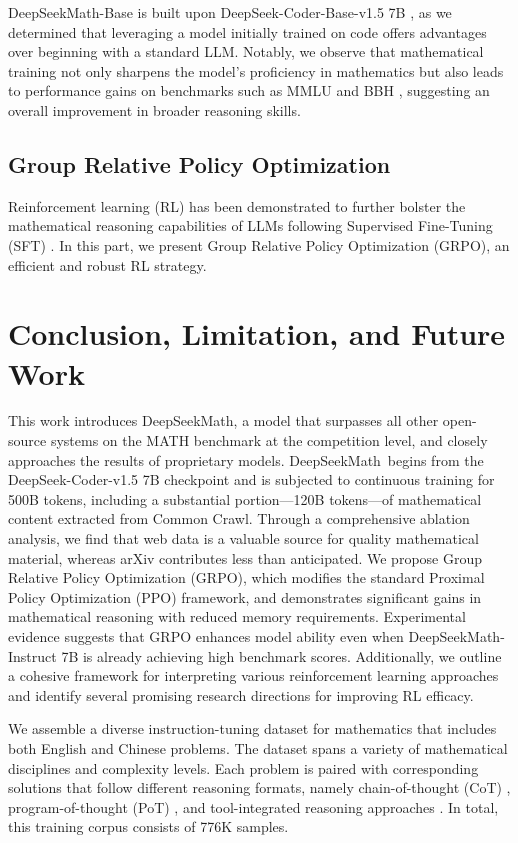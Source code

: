 DeepSeekMath-Base is built upon DeepSeek-Coder-Base-v1.5 7B \citep{deepseek-coder}, as we determined that leveraging a model initially trained on code offers advantages over beginning with a standard LLM. Notably, we observe that mathematical training not only sharpens the model’s proficiency in mathematics but also leads to performance gains on benchmarks such as MMLU \citep{mmlu} and BBH \citep{bbh}, suggesting an overall improvement in broader reasoning skills.

\subsection{Group Relative Policy Optimization} Reinforcement learning (RL) has been demonstrated to further bolster the mathematical reasoning capabilities of LLMs following Supervised Fine-Tuning (SFT) \citep{wang2023math,wizardmath}. In this part, we present Group Relative Policy Optimization (GRPO), an efficient and robust RL strategy.

\section{Conclusion, Limitation, and Future Work} This work introduces DeepSeekMath, a model that surpasses all other open-source systems on the MATH benchmark at the competition level, and closely approaches the results of proprietary models. DeepSeekMath~begins from the DeepSeek-Coder-v1.5 7B checkpoint and is subjected to continuous training for 500B tokens, including a substantial portion—120B tokens—of mathematical content extracted from Common Crawl. Through a comprehensive ablation analysis, we find that web data is a valuable source for quality mathematical material, whereas arXiv contributes less than anticipated. We propose Group Relative Policy Optimization (GRPO), which modifies the standard Proximal Policy Optimization (PPO) framework, and demonstrates significant gains in mathematical reasoning with reduced memory requirements. Experimental evidence suggests that GRPO enhances model ability even when DeepSeekMath-Instruct 7B is already achieving high benchmark scores. Additionally, we outline a cohesive framework for interpreting various reinforcement learning approaches and identify several promising research directions for improving RL efficacy.

We assemble a diverse instruction-tuning dataset for mathematics that includes both English and Chinese problems. The dataset spans a variety of mathematical disciplines and complexity levels. Each problem is paired with corresponding solutions that follow different reasoning formats, namely chain-of-thought (CoT) \citep{cot}, program-of-thought (PoT) \citep{pot,pal}, and tool-integrated reasoning approaches \citep{tora}. In total, this training corpus consists of 776K samples.

